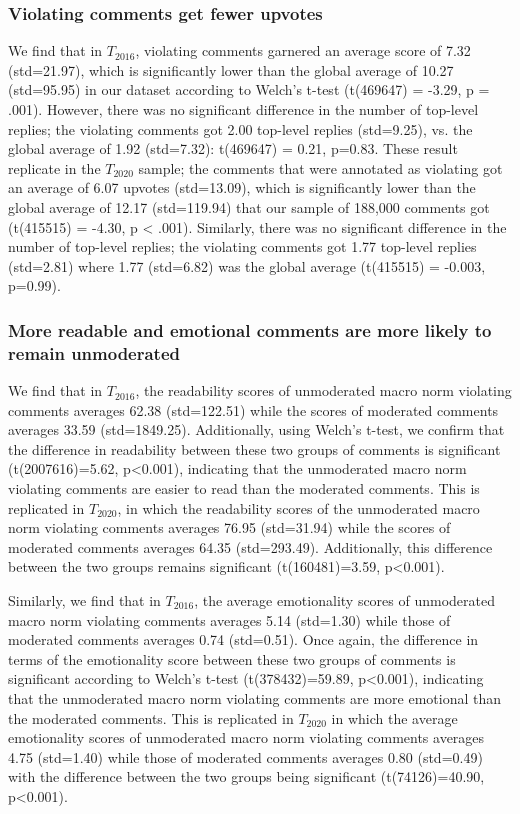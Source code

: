 \subsubsection{Violating comments get fewer upvotes}
We find that in $T_{2016}$,  violating comments garnered an average score of 7.32 (std=21.97), which is significantly lower than the global average of 10.27 (std=95.95) in our dataset according to Welch's t-test (t(469647) = -3.29, p = .001). However, there was no significant difference in the number of top-level replies; the violating comments got 2.00 top-level replies (std=9.25), vs. the global average of 1.92 (std=7.32): t(469647) = 0.21, p=0.83. These result replicate in the $T_{2020}$ sample; the comments that were annotated as violating got an average of 6.07 upvotes (std=13.09), which is significantly lower than the global average of 12.17 (std=119.94) that our sample of 188,000 comments got (t(415515) = -4.30, p < .001). Similarly, there was no significant difference in the number of top-level replies; the violating comments got 1.77 top-level replies (std=2.81) where  1.77 (std=6.82) was the global average (t(415515) = -0.003, p=0.99).





\subsubsection{More readable and emotional comments are more likely to remain unmoderated} We find that in $T_{2016}$, the readability scores of unmoderated macro norm violating comments averages 62.38 (std=122.51) while the scores of moderated comments averages 33.59 (std=1849.25). Additionally, using Welch's t-test, we confirm that the difference in readability between these two groups of comments is significant (t(2007616)=5.62, p<0.001), indicating that the unmoderated macro norm violating comments are easier to read than the moderated comments. This is replicated in $T_{2020}$, in which the readability scores of the unmoderated macro norm violating comments averages 76.95 (std=31.94) while the scores of moderated comments averages 64.35 (std=293.49). Additionally, this difference between the two groups remains significant (t(160481)=3.59, p<0.001). 

Similarly, we find that in $T_{2016}$, the average emotionality scores of unmoderated macro norm violating comments averages 5.14 (std=1.30) while those of moderated comments averages 0.74 (std=0.51). Once again, the difference in terms of the emotionality score between these two groups of comments is significant according to Welch's t-test (t(378432)=59.89, p<0.001), indicating that the unmoderated macro norm violating comments are more emotional than the moderated comments. This is replicated in $T_{2020}$ in which the average emotionality scores of unmoderated macro norm violating comments averages 4.75 (std=1.40) while those of moderated comments averages 0.80 (std=0.49) with the difference between the two groups being significant (t(74126)=40.90, p<0.001). 


